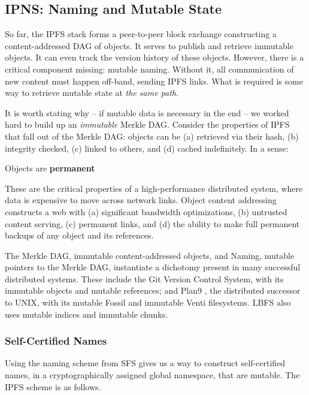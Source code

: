 \documentclass{sig-alternate}
\begin{document}
\subsection{IPNS: Naming and Mutable State}

So far, the IPFS stack forms a peer-to-peer block exchange constructing a content-addressed DAG of objects. It serves to publish and retrieve immutable objects. It can even track the version history of these objects. However, there is a critical component missing: mutable naming. Without it, all communication of new content must happen off-band, sending IPFS links. What is required is some way to retrieve mutable state at \textit{the same path}.

It is worth stating why -- if mutable data is necessary in the end -- we worked hard to build up an \textit{immutable} Merkle DAG. Consider the properties of IPFS that fall out of the Merkle DAG: objects can be (a) retrieved via their hash, (b) integrity checked, (c) linked to others, and (d) cached indefinitely. In a sense:

\begin{center}
  Objects are \textbf{permanent}
\end{center}

\noindent These are the critical properties of a high-performance distributed system, where data is expensive to move across network links. Object content addressing constructs a web with (a) significant bandwidth optimizations, (b) untrusted content serving, (c) permanent links, and (d) the ability to make full permanent backups of any object and its references.

The Merkle DAG, immutable content-addressed objects, and Naming, mutable pointers to the Merkle DAG, instantiate a dichotomy present in many successful distributed systems. These include the Git Version Control System, with its immutable objects and mutable references; and Plan9 \cite{Plan9}, the distributed successor to UNIX, with its mutable Fossil \cite{Fossil} and immutable Venti \cite{Venti} filesystems. LBFS \cite{LBFS} also uses mutable indices and immutable chunks.

\subsubsection{Self-Certified Names}

Using the naming scheme from SFS \cite{SFS} gives us a way to construct self-certified names, in a cryptographically assigned global namespace, that are mutable. The IPFS scheme is as follows.
\end{document}
